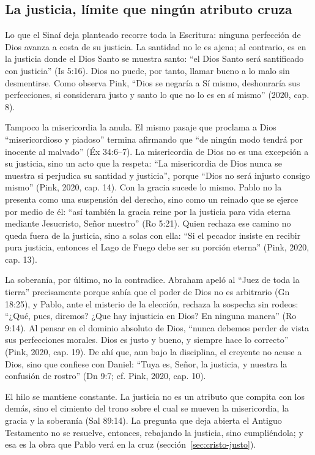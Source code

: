 \documentclass[11pt,letterpaper]{article}
\begin{document}
\subsection{La justicia, límite que ningún atributo cruza}
Lo que el Sinaí deja planteado recorre toda la Escritura: ninguna perfección de Dios avanza a costa de su justicia. La santidad no le es ajena; al contrario, es en la justicia donde el Dios Santo se muestra santo: ``el Dios Santo será santificado con justicia'' (Is 5:16). Dios no puede, por tanto, llamar bueno a lo malo sin desmentirse. Como observa Pink, ``Dios se negaría a Sí mismo, deshonraría sus perfecciones, si considerara justo y santo lo que no lo es en sí mismo'' (2020, cap. 8).

Tampoco la misericordia la anula. El mismo pasaje que proclama a Dios ``misericordioso y piadoso'' termina afirmando que ``de ningún modo tendrá por inocente al malvado'' (Éx 34:6--7). La misericordia de Dios no es una excepción a su justicia, sino un acto que la respeta: ``La misericordia de Dios nunca se muestra si perjudica su santidad y justicia'', porque ``Dios no será injusto consigo mismo'' (Pink, 2020, cap. 14). Con la gracia sucede lo mismo. Pablo no la presenta como una suspensión del derecho, sino como un reinado que se ejerce por medio de él: ``así también la gracia reine por la justicia para vida eterna mediante Jesucristo, Señor nuestro'' (Ro 5:21). Quien rechaza ese camino no queda fuera de la justicia, sino a solas con ella: ``Si el pecador insiste en recibir pura justicia, entonces el Lago de Fuego debe ser su porción eterna'' (Pink, 2020, cap. 13).

La soberanía, por último, no la contradice. Abraham apeló al ``Juez de toda la tierra'' precisamente porque sabía que el poder de Dios no es arbitrario (Gn 18:25), y Pablo, ante el misterio de la elección, rechaza la sospecha sin rodeos: ``¿Qué, pues, diremos? ¿Que hay injusticia en Dios? En ninguna manera'' (Ro 9:14). Al pensar en el dominio absoluto de Dios, ``nunca debemos perder de vista sus perfecciones morales. Dios es justo y bueno, y siempre hace lo correcto'' (Pink, 2020, cap. 19). De ahí que, aun bajo la disciplina, el creyente no acuse a Dios, sino que confiese con Daniel: ``Tuya es, Señor, la justicia, y nuestra la confusión de rostro'' (Dn 9:7; cf. Pink, 2020, cap. 10).

El hilo se mantiene constante. La justicia no es un atributo que compita con los demás, sino el cimiento del trono sobre el cual se mueven la misericordia, la gracia y la soberanía (Sal 89:14). La pregunta que deja abierta el Antiguo Testamento no se resuelve, entonces, rebajando la justicia, sino cumpliéndola; y esa es la obra que Pablo verá en la cruz (sección~\ref{sec:cristo-justo}).
\end{document}
